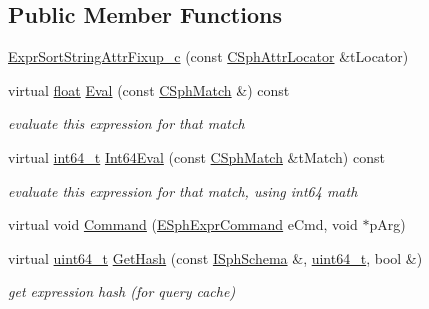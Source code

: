 \subsection*{Public Member Functions}
\begin{DoxyCompactItemize}
\item 
\hyperlink{structExprSortStringAttrFixup__c_a1945086572538955004bcab4348e28e4}{Expr\-Sort\-String\-Attr\-Fixup\-\_\-c} (const \hyperlink{structCSphAttrLocator}{C\-Sph\-Attr\-Locator} \&t\-Locator)
\item 
virtual \hyperlink{sphinxexpr_8cpp_a0e0d0739f7035f18f949c2db2c6759ec}{float} \hyperlink{structExprSortStringAttrFixup__c_afa114456e7bcd3b309825aaf0173d6d5}{Eval} (const \hyperlink{classCSphMatch}{C\-Sph\-Match} \&) const 
\begin{DoxyCompactList}\small\item\em evaluate this expression for that match \end{DoxyCompactList}\item 
virtual \hyperlink{sphinxstd_8h_a996e72f71b11a5bb8b3b7b6936b1516d}{int64\-\_\-t} \hyperlink{structExprSortStringAttrFixup__c_a3db3de89e88d5b9d97f081b1186e225a}{Int64\-Eval} (const \hyperlink{classCSphMatch}{C\-Sph\-Match} \&t\-Match) const 
\begin{DoxyCompactList}\small\item\em evaluate this expression for that match, using int64 math \end{DoxyCompactList}\item 
virtual void \hyperlink{structExprSortStringAttrFixup__c_a0e511ec47249e482d69415c2eb8352ec}{Command} (\hyperlink{sphinxexpr_8h_a30be184fb07bd80c271360fc6094c818}{E\-Sph\-Expr\-Command} e\-Cmd, void $\ast$p\-Arg)
\item 
virtual \hyperlink{sphinxstd_8h_aaa5d1cd013383c889537491c3cfd9aad}{uint64\-\_\-t} \hyperlink{structExprSortStringAttrFixup__c_a12a5cc7c427e283a5ab24212738b857e}{Get\-Hash} (const \hyperlink{classISphSchema}{I\-Sph\-Schema} \&, \hyperlink{sphinxstd_8h_aaa5d1cd013383c889537491c3cfd9aad}{uint64\-\_\-t}, bool \&)
\begin{DoxyCompactList}\small\item\em get expression hash (for query cache) \end{DoxyCompactList}\end{DoxyCompactItemize}
